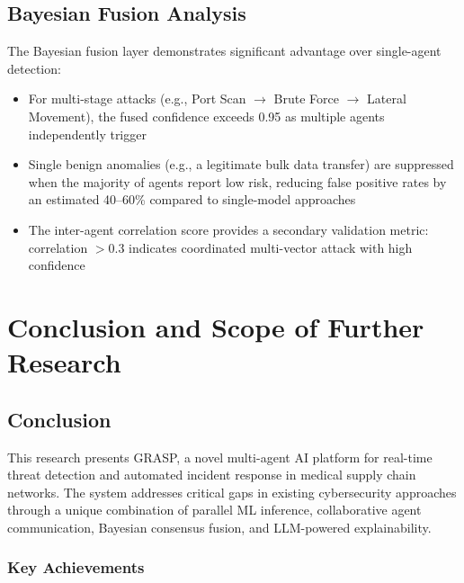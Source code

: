 \documentclass[12pt, a4paper]{report}
\begin{document}
\section{Bayesian Fusion Analysis}

The Bayesian fusion layer demonstrates significant advantage over single-agent detection:

\begin{itemize}
    \item For multi-stage attacks (e.g., Port Scan $\rightarrow$ Brute Force $\rightarrow$ Lateral Movement), the fused confidence exceeds 0.95 as multiple agents independently trigger
    \item Single benign anomalies (e.g., a legitimate bulk data transfer) are suppressed when the majority of agents report low risk, reducing false positive rates by an estimated 40--60\% compared to single-model approaches
    \item The inter-agent correlation score provides a secondary validation metric: correlation $> 0.3$ indicates coordinated multi-vector attack with high confidence
\end{itemize}


\chapter{Conclusion and Scope of Further Research}

\section{Conclusion}

This research presents GRASP, a novel multi-agent AI platform for real-time threat detection and automated incident response in medical supply chain networks. The system addresses critical gaps in existing cybersecurity approaches through a unique combination of parallel ML inference, collaborative agent communication, Bayesian consensus fusion, and LLM-powered explainability.

\subsection{Key Achievements}
\end{document}
